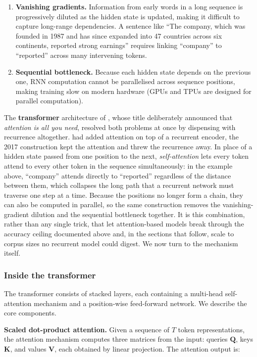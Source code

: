 \begin{enumerate}
\item \textbf{Vanishing gradients.} Information from early words in a long sequence is progressively diluted as the hidden state is updated, making it difficult to capture long-range dependencies. A sentence like ``The company, which was founded in 1987 and has since expanded into 47 countries across six continents, reported strong earnings'' requires linking ``company'' to ``reported'' across many intervening tokens.
\item \textbf{Sequential bottleneck.} Because each hidden state depends on the previous one, RNN computation cannot be parallelised across sequence positions, making training slow on modern hardware (GPUs and TPUs are designed for parallel computation).
\end{enumerate}

The \textbf{transformer} architecture of \cite{vaswani2017attention}, whose title deliberately announced that \textit{attention is all you need}, resolved both problems at once by dispensing with recurrence altogether. \cite{bahdanau2015attention} had added attention on top of a recurrent encoder, the 2017 construction kept the attention and threw the recurrence away. In place of a hidden state passed from one position to the next, \textit{self-attention} lets every token attend to every other token in the sequence simultaneously: in the example above, ``company'' attends directly to ``reported'' regardless of the distance between them, which collapses the long path that a recurrent network must traverse one step at a time. Because the positions no longer form a chain, they can also be computed in parallel, so the same construction removes the vanishing-gradient dilution and the sequential bottleneck together. It is this combination, rather than any single trick, that let attention-based models break through the accuracy ceiling documented above and, in the sections that follow, scale to corpus sizes no recurrent model could digest. We now turn to the mechanism itself.

\subsubsection{Inside the transformer}

The transformer consists of stacked layers, each containing a multi-head self-attention mechanism and a position-wise feed-forward network. We describe the core components.

\textbf{Scaled dot-product attention.} Given a sequence of $T$ token representations, the attention mechanism computes three matrices from the input: queries $\mathbf{Q}$, keys $\mathbf{K}$, and values $\mathbf{V}$, each obtained by linear projection. The attention output is:

